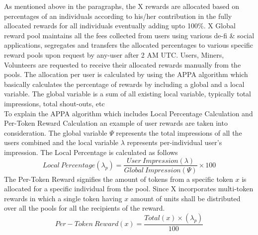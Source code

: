 \documentclass[letterpaper,11pt]{article}
\begin{document}
As mentioned above in the paragraphs, the X rewards are allocated based on percentages of an individuals according to his/her contribution in the fully allocated rewards for all individuals eventually adding upto 100\%.  X Global reward pool maintains all the fees collected from users using various de-fi \& social applications, segregates and transfers the allocated percentages to various specific reward pools upon request by any-user after 2  AM UTC. Users, Miners, Volunteers are requested to receive their allocated rewards manually from the pools. The allocation per user is calculated by using the APPA algorithm which basically calculates the percentage of rewards by including a global and a local variable. The global variable is a sum of all existing local variable, typically total impressions, total shout-outs, etc\\
To explain the APPA algorithm which includes Local Percentage Calculation and Per-Token Reward Calculation an example of user rewards are taken into consideration.  The global variable $	\Psi$ represents the total impressions of all the users combined and the local variable $\lambda$ represents per-individual user's impression.  The Local Percentage is calculated as follows \\
\[Local\:Percentage(\lambda_p)=\frac{User\:Impression(\lambda)}{Global\:Impression(\Psi)} \times 100\]
The Per-Token Reward signifies the amount of tokens from a specific token $x$ is allocated for a specific individual from the pool. Since X incorporates multi-token rewards in which a single token having $x$ amount of units shall be distributed over all the pools for all the recipients of the reward. \\
\[Per-Token\:Reward(x)=\frac{Total(x) \times (\lambda_p)}{100}\]
\end{document}
